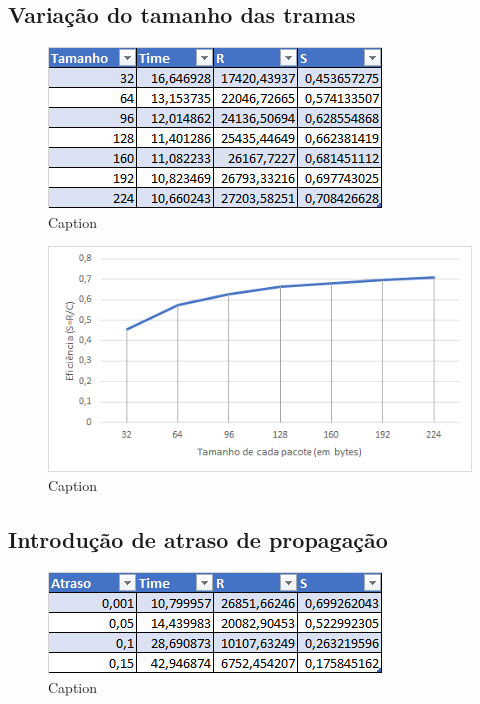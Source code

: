 \documentclass{article}
\begin{document}
\subsection{Variação do tamanho das tramas}

\begin{figure}[h]
	\includegraphics[width=\textwidth]{tabelaTamanho.png}
	\caption{Caption}
\end{figure}

\begin{figure}[h]
	\includegraphics[width=\textwidth]{tamanho.png}
	\caption{Caption}
\end{figure}

\subsection{Introdução de atraso de propagação}

\begin{figure}[h]
	\includegraphics[width=\textwidth]{tabelaAtraso.png}
	\caption{Caption}
\end{figure}
\end{document}

